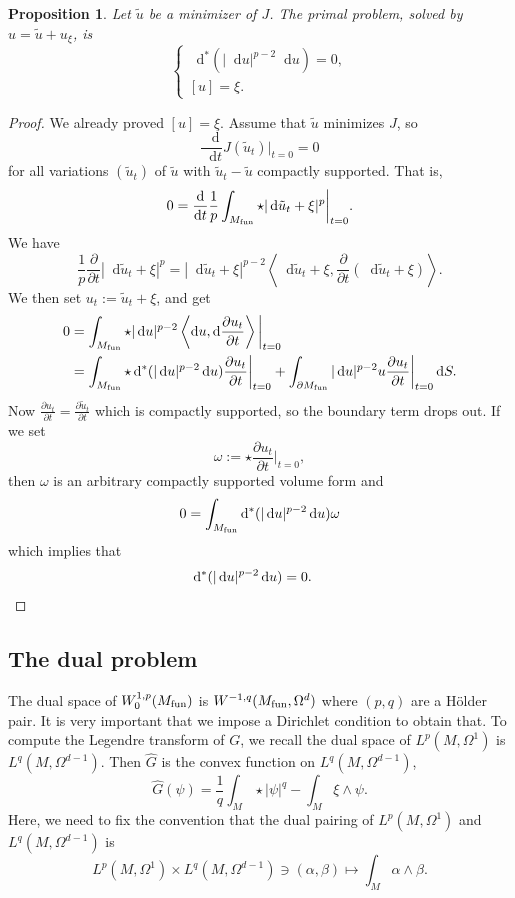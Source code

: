 \documentclass[reqno,12pt]{amsart}
\newcommand*\dif{\mathop{}\!\mathrm{d}}
\newtheorem{proposition}[theorem]{Proposition}
\theoremstyle{definition}
\numberwithin{equation}{section}
\begin{document}
\begin{proposition}
Let $\tilde u$ be a minimizer of $J$.
The primal problem, solved by $u = \tilde u + u_\xi$, is
\begin{equation}\label{primal pLap}
\begin{cases}
\dif^*(|\dif u|^{p - 2} \dif u) = 0, \\
[u] = \xi.
\end{cases}
\end{equation}
\end{proposition}
\begin{proof}
We already proved $[u] = \xi$.
Assume that $\tilde u$ minimizes $J$, so
$$\frac{\dif}{\dif t} J(\tilde u_t)\bigg|_{t = 0} = 0$$
for all variations $(\tilde u_t)$ of $\tilde u$ with $\tilde u_t - \tilde u$ compactly supported.
That is,
$$0 = \frac{\dif}{\dif t} \frac{1}{p} \int_{M_{\rm fun}} \star |\dif \tilde u_t + \xi|^p\bigg|_{t = 0}.$$
We have 
$$\frac{1}{p} \frac{\partial}{\partial t} |\dif \tilde u_t + \xi|^p = |\dif \tilde u_t + \xi|^{p - 2} \left\langle \dif \tilde u_t + \xi, \frac{\partial}{\partial t} (\dif \tilde u_t + \xi)\right\rangle.$$
We then set $u_t := \tilde u_t + \xi$, and get
\begin{align*}
0
&= \int_{M_{\rm fun}} \star |\dif u|^{p - 2} \left\langle \dif u, \dif \frac{\partial u_t}{\partial t}\right\rangle\bigg|_{t = 0} \\
&= \int_{M_{\rm fun}} \star \dif^* (|\dif u|^{p - 2} \dif u) \frac{\partial u_t}{\partial t}\bigg|_{t = 0} + \int_{\partial M_{\rm fun}} |\dif u|^{p - 2} u \frac{\partial u_t}{\partial t}\bigg|_{t=0} \dif S.
\end{align*}
Now $\frac{\partial u_t}{\partial t} = \frac{\partial \tilde u_t}{\partial t}$ which is compactly supported, so the boundary term drops out. If we set
$$\omega := \star \frac{\partial u_t}{\partial t}\bigg|_{t = 0},$$
then $\omega$ is an arbitrary compactly supported volume form and
$$0 = \int_{M_{\rm fun}} \dif^* (|\dif u|^{p - 2} \dif u) \omega$$
which implies that 
\begin{align*}
\dif^* (|\dif u|^{p - 2} \dif u) &= 0. \qedhere
\end{align*}
\end{proof}

\subsection{The dual problem}
The dual space of $W^{1, p}_0(M_{\rm fun})$ is $W^{-1, q}(M_{\rm fun}, \Omega^d)$ where $(p, q)$ are a H\"older pair.
It is very important that we impose a Dirichlet condition to obtain that.
To compute the Legendre transform of $G$, we recall the dual space of $L^p(M, \Omega^1)$ is $L^q(M, \Omega^{d - 1})$.
Then $\hat G$ is the convex function on $L^q(M, \Omega^{d - 1})$,
$$\hat G(\psi) = \frac{1}{q} \int_M \star |\psi|^q - \int_M \xi \wedge \psi.$$
Here, we need to fix the convention that the dual pairing of $L^p(M, \Omega^1)$ and $L^q(M, \Omega^{d - 1})$ is 
$$L^p(M, \Omega^1) \times L^q(M, \Omega^{d - 1}) \ni (\alpha, \beta) \mapsto \int_M \alpha \wedge \beta.$$
\end{document}
